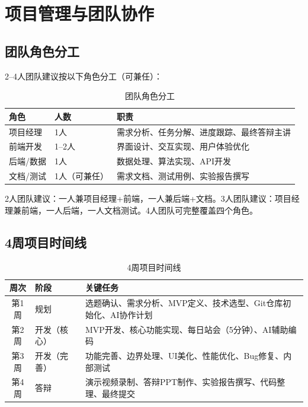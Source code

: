 \section{项目管理与团队协作}

\subsection{团队角色分工}

2--4人团队建议按以下角色分工（可兼任）：

\begin{table}[H]
\centering
\begin{tabular}{llp{6cm}}
\toprule
\textbf{角色} & \textbf{人数} & \textbf{职责} \\
\midrule
项目经理 & 1人 & 需求分析、任务分解、进度跟踪、最终答辩主讲 \\
前端开发 & 1--2人 & 界面设计、交互实现、用户体验优化 \\
后端/数据 & 1人 & 数据处理、算法实现、API开发 \\
文档/测试 & 1人（可兼任） & 需求文档、测试用例、实验报告撰写 \\
\bottomrule
\end{tabular}
\caption{团队角色分工}
\end{table}

2人团队建议：一人兼项目经理+前端，一人兼后端+文档。3人团队建议：项目经理兼前端，一人后端，一人文档测试。4人团队可完整覆盖四个角色。

\subsection{4周项目时间线}

\begin{table}[H]
\centering
\small
\begin{tabular}{clp{7cm}}
\toprule
\textbf{周次} & \textbf{阶段} & \textbf{关键任务} \\
\midrule
第1周 & 规划 & 选题确认、需求分析、MVP定义、技术选型、Git仓库初始化、AI协作计划 \\
第2周 & 开发（核心） & MVP开发、核心功能实现、每日站会（5分钟）、AI辅助编码 \\
第3周 & 开发（完善） & 功能完善、边界处理、UI美化、性能优化、Bug修复、内部测试 \\
第4周 & 答辩 & 演示视频录制、答辩PPT制作、实验报告撰写、代码整理、最终提交 \\
\bottomrule
\end{tabular}
\caption{4周项目时间线}
\end{table}

